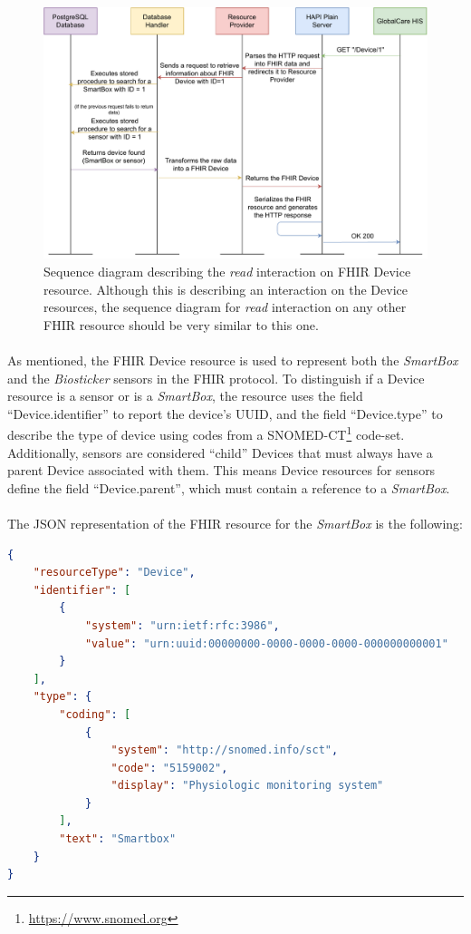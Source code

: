 \begin{figure}[H]
    \centering
    \includegraphics[width=0.9\linewidth]{images/fhir get device.pdf}
    \caption[Sequence diagram describing the \textit{read} interaction on \acs{FHIR} Device resource.]{Sequence diagram describing the \textit{read} interaction on \acs{FHIR} Device resource. Although this is describing an interaction on the Device resources, the sequence diagram for \textit{read} interaction on any other \acs{FHIR} resource should be very similar to this one.}
    \label{fig:fhir-get-device}
\end{figure} 

\paragraph{} As mentioned, the \acs{FHIR} Device resource is used to represent both the \textit{SmartBox} and the \textit{Biosticker} sensors in the \acs{FHIR} protocol. To distinguish if a Device resource is a sensor or is a \textit{SmartBox}, the resource uses the field ``Device.identifier'' to report the device's \acs{UUID}, and the field ``Device.type'' to describe the type of device using codes from a SNOMED-CT\footnote{\url {https://www.snomed.org}} code-set. Additionally, sensors are considered ``child'' Devices that must always have a parent Device associated with them. This means Device resources for sensors define the field ``Device.parent'', which must contain a reference to a \textit{SmartBox}. 

\paragraph{} The \acs{JSON} representation of the \acs{FHIR} resource for the \textit{SmartBox} is the following:
\begin{lstlisting}[language=json]            
{ 
    "resourceType": "Device", 
    "identifier": [ 
        { 
            "system": "urn:ietf:rfc:3986", 
            "value": "urn:uuid:00000000-0000-0000-0000-000000000001"  
        } 
    ], 
    "type": { 
        "coding": [ 
            { 
                "system": "http://snomed.info/sct", 
                "code": "5159002", 
                "display": "Physiologic monitoring system" 
            } 
        ], 
        "text": "Smartbox" 
    } 
}
\end{lstlisting} 
